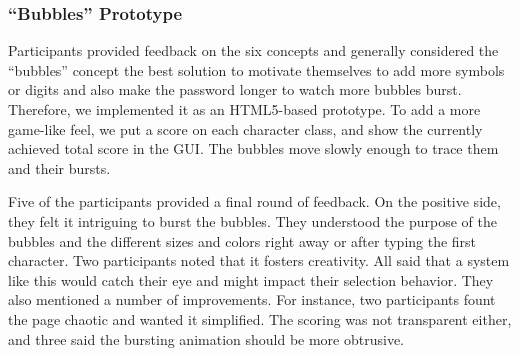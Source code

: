 \subsubsection{``Bubbles'' Prototype}
Participants provided feedback on the six concepts and generally considered the ``bubbles'' concept the best solution to motivate themselves to add more symbols or digits and also make the password longer to watch more bubbles burst. Therefore, we implemented it as an HTML5-based prototype. To add a more game-like feel, we put a score on each character class, and show the currently achieved total score in the GUI. The bubbles move slowly enough to trace them and their bursts. 

Five of the participants provided a final round of feedback. On the positive side, they felt it intriguing to burst the bubbles. They understood the purpose of the bubbles and the different sizes and colors right away or after typing the first character. Two participants noted that it fosters creativity. All said that a system like this would catch their eye and might impact their selection behavior. They also mentioned a number of improvements. For instance, two participants fount the page chaotic and wanted it simplified. The scoring was not transparent either, and three said the bursting animation should be more obtrusive. 

